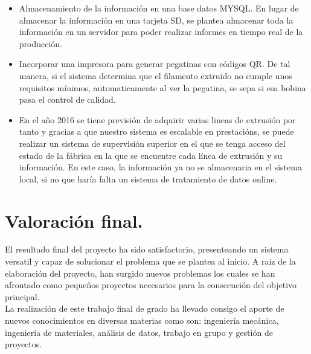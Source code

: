 \begin{itemize}
	\item{Almacenamiento de la información en una base datos MYSQL. En lugar de almacenar la información en una tarjeta SD, se plantea almacenar toda la información en un servidor para poder realizar informes en tiempo real de la producción.}
	\item{Incorporar una impresora para generar pegatinas con códigos QR. De tal manera, si el sistema determina que el filamento extruido no cumple unos requisitos mínimos, automaticamente al ver la pegatina, se sepa si esa bobina pasa el control de calidad.}
	\item{En el año 2016 se tiene previsión de adquirir varias lineas de extrusión por tanto y gracias a que nuestro sistema es escalable en prestacións, se puede realizar un sistema de supervisión superior en el que se tenga acceso del estado de la fábrica en la que se encuentre cada línea de extrusión y su información. En este caso, la información ya no se almacenaria en el sistema local, si no que haría falta un sistema de tratamiento de datos online.}

\end{itemize}

\section{Valoración final.}

El resultado final del proyecto ha sido satisfactorio, presenteando un sistema versatil y capaz de solucionar el problema que se plantea al inicio. A raiz de la elaboración del proyecto, han surgido nuevos problemas los cuales se han afrontado como pequeños proyectos necesarios para la consecución del objetivo principal.\\

La realización de este trabajo final de grado ha llevado consigo el aporte de nuevos conocimientos en diversas materias como son: ingeniería mecánica, ingeniería de materiales, análisis de datos, trabajo en grupo y gestión de proyectos.